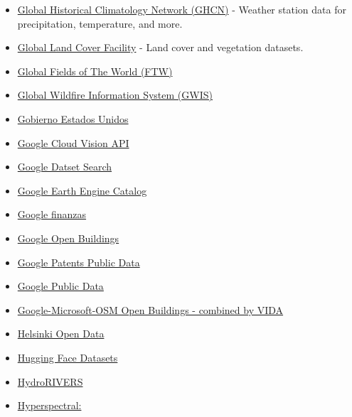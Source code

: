 \documentclass[
  letterpaper,
  DIV=11,
  numbers=noendperiod]{scrartcl}
\begin{document}
\begin{itemize}
  \href{https://github.com/VU-IVM/GLOPOP-S}{Github}
  \href{https://www.nature.com/articles/s41597-024-03864-2}{Paper}
\item
  \href{https://www.ncei.noaa.gov/products/land-based-station/global-historical-climatology-network-daily}{Global
  Historical Climatology Network (GHCN)} - Weather station data for
  precipitation, temperature, and more.
\item
  \href{https://www.un-spider.org/links-and-resources/data-sources/global-land-cover-facility-university-maryland-nasa-gofc-gold}{Global
  Land Cover Facility} - Land cover and vegetation datasets.
\item
  \href{https://source.coop/ftw/global-data}{Global Fields of The World
  (FTW)}
\item
  \href{https://gwis.jrc.ec.europa.eu/}{Global Wildfire Information
  System (GWIS)}
\item
  \href{http://www.data.gov/}{Gobierno Estados Unidos}
\item
  \href{https://cloud.google.com/vision/}{Google Cloud Vision API}
\item
  \href{https://datasetsearch.research.google.com/}{Google Datset
  Search}
\item
  \href{https://github.com/opengeos/Earth-Engine-Catalog}{Google Earth
  Engine Catalog}
\item
  \href{http://www.google.com/finance/}{Google finanzas}
\item
  \href{https://sites.research.google/gr/open-buildings/}{Google Open
  Buildings}
\item
  \href{https://console.cloud.google.com/marketplace/product/google_patents_public_datasets/google-patents-public-data}{Google
  Patents Public Data}
\item
  \href{https://www.google.com/publicdata/directory}{Google Public Data}
\item
  \href{https://beta.source.coop/repositories/vida/google-microsoft-osm-open-buildings/description/}{Google-Microsoft-OSM
  Open Buildings - combined by VIDA}
\item
  \href{http://www.hri.fi/en/}{Helsinki Open Data}
\item
  \href{https://huggingface.co/datasets}{Hugging Face Datasets}
\item
  \href{https://www.hydrosheds.org/products/hydrorivers}{HydroRIVERS}
\item
  \href{https://www.planet.com/pulse/unleash-the-power-of-hyperspectral-over-50-tanager-radiance-datasets-now-available-on-planet-s/}{Hyperspectral:
}
\end{itemize}
\end{document}
